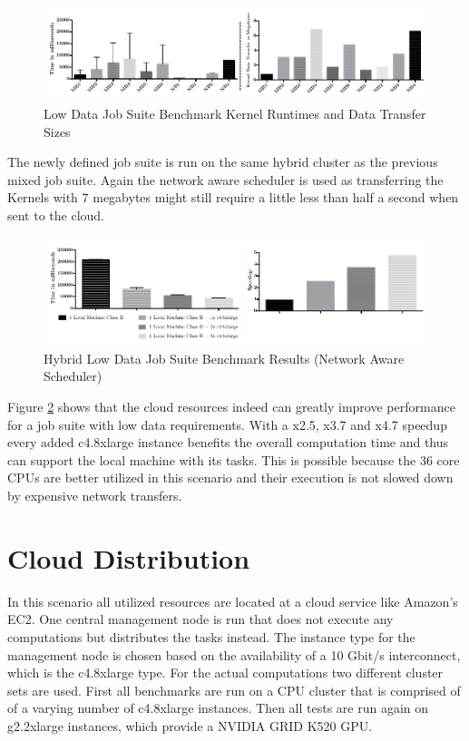 \begin{figure}[H]	
	\includegraphics[width=1.0\textwidth]{images/lowdata_benchmark_statistics.pdf}
	\centering
	\caption{Low Data Job Suite Benchmark Kernel Runtimes and Data Transfer Sizes}
	\label{img:low_data_benchmark_statistics}
\end{figure}

The newly defined job suite is run on the same hybrid cluster as the previous mixed job suite. Again the network aware scheduler is used as transferring the Kernels with 7 megabytes might still require a little less than half a second when sent to the cloud.

\begin{figure}[H]	
	\includegraphics[width=1.0\textwidth]{images/hybrid_lowdata_benchmark.pdf}
	\centering
	\caption{Hybrid Low Data Job Suite Benchmark Results (Network Aware Scheduler)}
	\label{img:hybrid_low_data_benchmark_results_network_aware}
\end{figure}

Figure \ref{img:hybrid_low_data_benchmark_results_network_aware} shows that the cloud resources indeed can greatly improve performance for a job suite with low data requirements. With a x2.5, x3.7 and x4.7 speedup every added c4.8xlarge instance benefits the overall computation time and thus can support the local machine with its tasks. This is possible because the 36 core CPUs are better utilized in this scenario and their execution is not slowed down by expensive network transfers.

\section{Cloud Distribution}

In this scenario all utilized resources are located at a cloud service like Amazon's EC2. One central management node is run that does not execute any computations but distributes the tasks instead. The instance type for the management node is chosen based on the availability of a 10 Gbit/s interconnect, which is the c4.8xlarge type. For the actual computations two different cluster sets are used. First all benchmarks are run on a CPU cluster that is comprised of of a varying number of c4.8xlarge instances. Then all tests are run again on g2.2xlarge instances, which provide a NVIDIA GRID K520 GPU.

